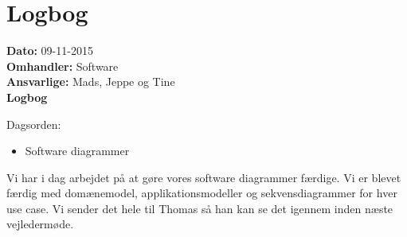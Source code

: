 \section{Logbog}

\textbf{Dato:} 09-11-2015 \\
\textbf{Omhandler:} Software \\
\textbf{Ansvarlige:} Mads, Jeppe og Tine \\
\textbf{Logbog}

Dagsorden:
\begin{itemize}
	\item Software diagrammer 
\end{itemize}

Vi har i dag arbejdet på at gøre vores software diagrammer færdige. Vi er blevet færdig med domænemodel, applikationsmodeller og sekvensdiagrammer for hver use case. Vi sender det hele til Thomas så han kan se det igennem inden næste vejledermøde.  
   
